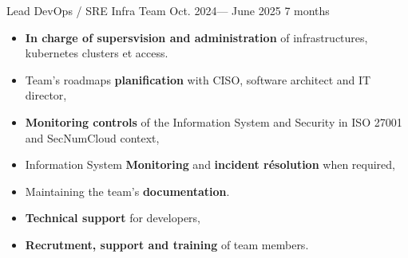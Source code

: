 \jobposition%
{Lead DevOps / SRE}%
{Infra Team}%
{Oct. 2024--- June 2025}%
{7 months}%
{
	\begin{itemize}
	  \item \textbf{In charge of supersvision and administration} of infrastructures, kubernetes clusters et access.
		\item Team's roadmaps \textbf{planification} with CISO, software architect
		  and IT director,
		\item \textbf{Monitoring controls} of the Information System and Security in ISO 27001 and SecNumCloud context,
		\item Information System \textbf{Monitoring} and \textbf{incident résolution}
		  when required,
		\item Maintaining the team's \textbf{documentation}.
		\item \textbf{Technical support} for developers,
		\item \textbf{Recrutment, support and training} of team members.
	\end{itemize}
}
